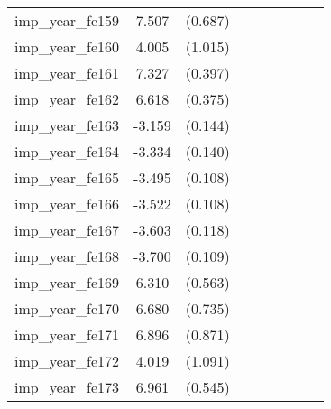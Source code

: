 {\begin{tabular}{l*{4}{cc}}
imp\_year\_fe159&    7.507\sym{***}&  (0.687)&                  &         &                  &         &                  &         \\
imp\_year\_fe160&    4.005\sym{***}&  (1.015)&                  &         &                  &         &                  &         \\
imp\_year\_fe161&    7.327\sym{***}&  (0.397)&                  &         &                  &         &                  &         \\
imp\_year\_fe162&    6.618\sym{***}&  (0.375)&                  &         &                  &         &                  &         \\
imp\_year\_fe163&   -3.159\sym{***}&  (0.144)&                  &         &                  &         &                  &         \\
imp\_year\_fe164&   -3.334\sym{***}&  (0.140)&                  &         &                  &         &                  &         \\
imp\_year\_fe165&   -3.495\sym{***}&  (0.108)&                  &         &                  &         &                  &         \\
imp\_year\_fe166&   -3.522\sym{***}&  (0.108)&                  &         &                  &         &                  &         \\
imp\_year\_fe167&   -3.603\sym{***}&  (0.118)&                  &         &                  &         &                  &         \\
imp\_year\_fe168&   -3.700\sym{***}&  (0.109)&                  &         &                  &         &                  &         \\
imp\_year\_fe169&    6.310\sym{***}&  (0.563)&                  &         &                  &         &                  &         \\
imp\_year\_fe170&    6.680\sym{***}&  (0.735)&                  &         &                  &         &                  &         \\
imp\_year\_fe171&    6.896\sym{***}&  (0.871)&                  &         &                  &         &                  &         \\
imp\_year\_fe172&    4.019\sym{***}&  (1.091)&                  &         &                  &         &                  &         \\
imp\_year\_fe173&    6.961\sym{***}&  (0.545)&                  &         &                  &         &                  &         \\

\end{tabular}}
